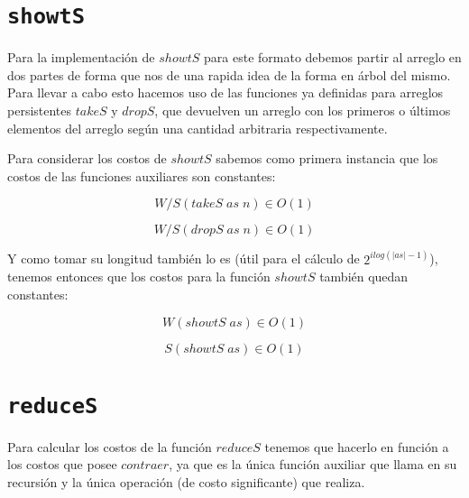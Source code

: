 \documentclass[a4paper,10pt]{article}
\begin{document}
\bigskip


\section*{\texttt{showtS}}

    Para la implementación de $showtS$ para este formato debemos partir al arreglo
en dos partes de forma que nos de una rapida idea de la forma en árbol del mismo.
Para llevar a cabo esto hacemos uso de las funciones ya definidas para arreglos 
persistentes $takeS$ y $dropS$, que devuelven un arreglo con los primeros o últimos
elementos del arreglo según una cantidad arbitraria respectivamente.



    Para considerar los costos de $showtS$ sabemos como primera instancia que los
costos de las funciones auxiliares son constantes:

\begin{equation*}
    W/S \left( takeS\; as\; n \right) \in 
    O \left( 1 \right)
\end{equation*}

\begin{equation*}
    W/S \left( dropS\; as\; n \right) \in 
    O \left( 1 \right)
\end{equation*}

\bigskip
   
    Y como tomar su longitud también lo es (útil para el cálculo de 
$2^{ilog(\vert as \vert -1)}$), tenemos entonces que los costos para la función
$showtS$ también quedan constantes:

\begin{equation*}
    W \left( showtS\; as \right) \in O \left( 1 \right)
\end{equation*}

\begin{equation*}
    S \left( showtS\; as \right) \in O \left( 1 \right)
\end{equation*}


\bigskip
    

\section*{\texttt{reduceS}}

    Para calcular los costos de la función $reduceS$ tenemos que hacerlo en función
a los costos que posee $contraer$, ya que es la única función auxiliar que llama en
su recursión y la única operación (de costo significante) que realiza.



\end{document}

